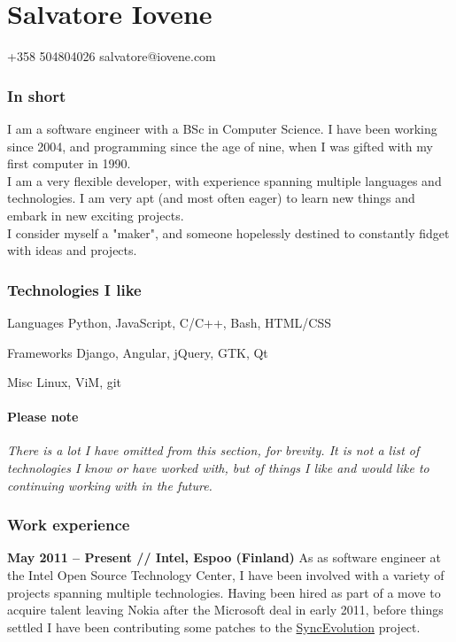 \documentclass[10pt]{tccv}
\begin{document}
	\part{Salvatore Iovene}
			{+358 504804026}
			{salvatore@iovene.com}


		\section{In short}
			I am a software engineer with a BSc in Computer Science. I have
			been working since 2004, and programming since the age of nine,
			when I was gifted with my first computer in 1990.\\
			
			I am a very flexible developer, with experience spanning multiple
			languages and technologies. I am very apt (and most often eager) to
			learn new things and embark in new exciting projects.\\
			
			I consider myself a "maker", and someone hopelessly destined to
			constantly fidget with ideas and projects.


		\section{Technologies I like}
			\begin{factlist}
				\item{Languages}
					{Python, JavaScript, C/C++, Bash,
					HTML/CSS}

				\item{Frameworks}
					{Django, Angular, jQuery, GTK, Qt}

				\item{Misc}
					{Linux, ViM, git }
			\end{factlist}

			\subsection{Please note}
				\emph{There is a lot I have omitted from this section, for
				brevity. It is not a list of technologies I know or have worked
				with, but of things I like and would like to continuing working
				with in the future.}


		\section{Work experience}
				\textbf{May 2011 -- Present // Intel, Espoo (Finland)}
				As as software engineer at the Intel Open Source Technology
				Center, I have been involved with a variety of projects
				spanning multiple technologies. Having been hired as part of a
				move to acquire talent leaving Nokia after the Microsoft deal
				in early 2011, before things settled I have been contributing
				some patches to the
				\href{https://syncevolution.org/}{SyncEvolution} project.\\
\end{document}
